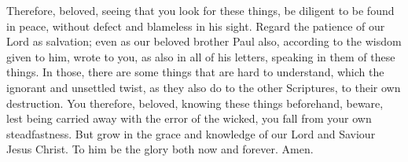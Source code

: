  Therefore, beloved, seeing that you look for these things,
be diligent to be found in peace, without defect and blameless in his
sight.  Regard the patience of our Lord as salvation; even
as our beloved brother Paul also, according to the wisdom given to him,
wrote to you,  as also in all of his letters, speaking in
them of these things. In those, there are some things that are hard to
understand, which the ignorant and unsettled twist, as they also do to
the other Scriptures, to their own destruction.  You
therefore, beloved, knowing these things beforehand, beware, lest being
carried away with the error of the wicked, you fall from your own
steadfastness.  But grow in the grace and knowledge of our
Lord and Saviour Jesus Christ. To him be the glory both now and forever.
Amen.
